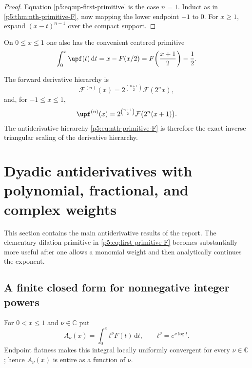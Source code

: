 \documentclass[11pt,oneside]{article}
\theoremstyle{definition}
\theoremstyle{remark}
\newcommand{\C}{\mathbb C}
\newcommand{\dd}{\,\mathrm d}
\newcommand{\1}{\mathbf 1}
\begin{document}
\begin{proof}
Equation \eqref{p5:eq:up-first-primitive} is the case $n=1$.  Induct as in \cref{p5:thm:nth-primitive-F}, now mapping the lower endpoint $-1$ to $0$.  For $x\ge1$, expand $(x-t)^{n-1}$ over the compact support.
\end{proof}

On $0\le x\le1$ one also has the convenient centered primitive
\begin{equation}\label{p5:eq:local-up-primitive}
 \int_0^x\upf(t)\dd t
 =x-F(x/2)
 =F\!\left(\frac{x+1}{2}\right)-\frac12.
\end{equation}

The forward derivative hierarchy is
\begin{equation}\label{p5:eq:forward-derivative-hierarchy}
 \mathcal F^{(n)}(x)=2^{\binom{n+1}{2}}\mathcal F(2^nx),
\end{equation}
and, for $-1\le x\le1$,
\begin{equation}\label{p5:eq:up-derivative-hierarchy}
 \upf^{(n)}(x)=2^{\binom{n+1}{2}}
 \mathcal F\bigl(2^n(x+1)\bigr).
\end{equation}
The antiderivative hierarchy \eqref{p5:eq:nth-primitive-F} is therefore the exact inverse triangular scaling of the derivative hierarchy.

\section{Dyadic antiderivatives with polynomial, fractional, and complex weights}

This section contains the main antiderivative results of the report.  The elementary dilation primitive in \cref{p5:eq:first-primitive-F} becomes substantially more useful after one allows a monomial weight and then analytically continues the exponent.

\subsection{A finite closed form for nonnegative integer powers}

For $0<x\le1$ and $\nu\in\C$ put
\begin{equation}\label{p5:eq:A-nu-def}
 A_\nu(x)=\int_0^x t^\nu F(t)\dd t,
 \qquad t^\nu=e^{\nu\log t}.
\end{equation}
Endpoint flatness makes this integral locally uniformly convergent for every $\nu\in\C$; hence $A_\nu(x)$ is entire as a function of $\nu$.
\end{document}
